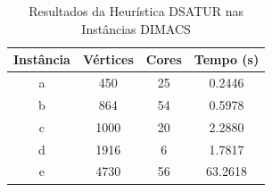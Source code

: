 \begin{table}[H]
\centering
\caption{Resultados da Heurística DSATUR nas Instâncias DIMACS}
\label{tab:resultados_dsatur_2}
\begin{tabular}{cccc}
\toprule
Instância & Vértices & Cores & Tempo (s) \\
\midrule
a & 450 & 25 & 0.2446 \\
b & 864 & 54 & 0.5978 \\
c & 1000 & 20 & 2.2880 \\
d & 1916 & 6 & 1.7817 \\
e & 4730 & 56 & 63.2618 \\
\bottomrule
\end{tabular}
\end{table}

